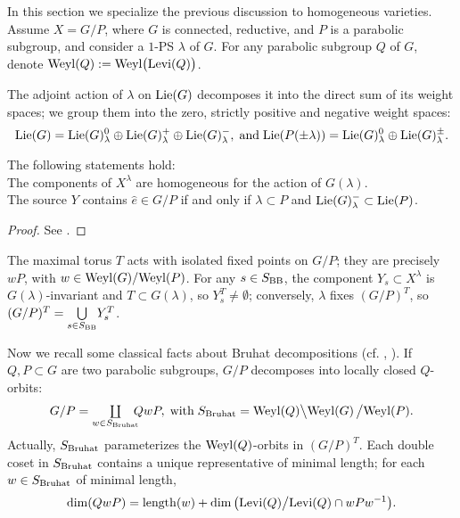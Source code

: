 \documentclass[11pt,reqno]{amsart}
\let\nit\noindent
\numberwithin{equation}{section}
\numberwithin{figure}{section}
\let\l\lambda
\begin{document}
In this section we specialize the previous discussion to homogeneous varieties. 
Assume $X=G/P$, where $G$ is connected, reductive, and $P$ is a parabolic 
subgroup, and consider a $1$-PS $\l$ of $G$. For any parabolic subgroup 
$Q$ of $G$, denote ${\mathop{\rm{Weyl}}\nolimits}(Q):={\mathop{\rm{Weyl}}\nolimits}\big({\mathop{\rm Levi}\nolimits}(Q)\big)$. 

The adjoint action of $\l$ on ${\mathop{\rm Lie}\nolimits}(G)$ decomposes it into the direct sum of its weight 
spaces; we group them into the zero, strictly positive and negative weight spaces: 
\begin{equation}\label{eq:LG}
{\mathop{\rm Lie}\nolimits}(G)={\mathop{\rm Lie}\nolimits}(G)^0_\l\oplus{\mathop{\rm Lie}\nolimits}(G)^{+}_\l\oplus{\mathop{\rm Lie}\nolimits}(G)^{-}_\l, 
\;\text{and}\;
{\mathop{\rm Lie}\nolimits}(P(\pm\l))={\mathop{\rm Lie}\nolimits}(G)^0_\l\oplus{\mathop{\rm Lie}\nolimits}(G)^\pm_\l. 
\end{equation}

\begin{m-lemma}\label{lm:y-homog} 
The following statements hold:
\\ \nit{\rm(i)} 
The components of $X^\l$ are homogeneous for the action of $G(\l)$.
\\ \nit{\rm(ii)} 
The source $Y$ contains $\hat e\in G/P$ if and only if 
$\l\subset P$ and ${\mathop{\rm Lie}\nolimits}(G)^-_\l\subset{\mathop{\rm Lie}\nolimits}(P)$. 
\end{m-lemma}

\begin{proof}
See \cite{hal+taj}. 
\end{proof}

The maximal torus $T$ acts with isolated fixed points on $G/P$; they are precisely 
$wP$, with $w\in{\mathop{\rm{Weyl}}\nolimits}(G)\slash{\mathop{\rm{Weyl}}\nolimits}(P)$. For any ${s\in S_{{\rm BB}}}$, the component 
$Y_s\subset X^\l$ is $G(\l)$-invariant and $T\subset G(\l)$, so $Y_s^T\neq\emptyset$; 
conversely, $\l$ fixes $(G/P)^T$, so $(G/P)^T=\underset{s\in S_{{\rm BB}}}{\bigcup}Y_s^T$. 

Now we recall some classical facts about Bruhat decompositions (cf. \cite[\S 8]{mitch}, 
\cite[\S 8]{sp}). 
If $Q,P\subset G$ are two parabolic subgroups, $G/P$ decomposes into locally closed $Q$-orbits:
$$
G/P=\underset{w\in S_{{\rm Bruhat}}}{\mbox{$\coprod$}}\kern-1exQwP,
\;\text{with}\;
S_{{\rm Bruhat}}={\mathop{\rm{Weyl}}\nolimits}(Q)\big\backslash{\mathop{\rm{Weyl}}\nolimits}(G)\,\big\slash{\mathop{\rm{Weyl}}\nolimits}(P).
$$
Actually, $S_{{\rm Bruhat}}$ parameterizes the ${\mathop{\rm{Weyl}}\nolimits}(Q)$-orbits in $(G/P)^T$. 
Each double coset in $S_{{\rm Bruhat}}$ contains a unique representative of minimal length; 
for each $w\in S_{{\rm Bruhat}}$ of minimal length, 
$$
\dim (QwP)={\rm length}(w)+\dim\big({\mathop{\rm Levi}\nolimits}(Q)\big/{\mathop{\rm Levi}\nolimits}(Q)\cap wPw^{-1}\big).
$$
\end{document}
